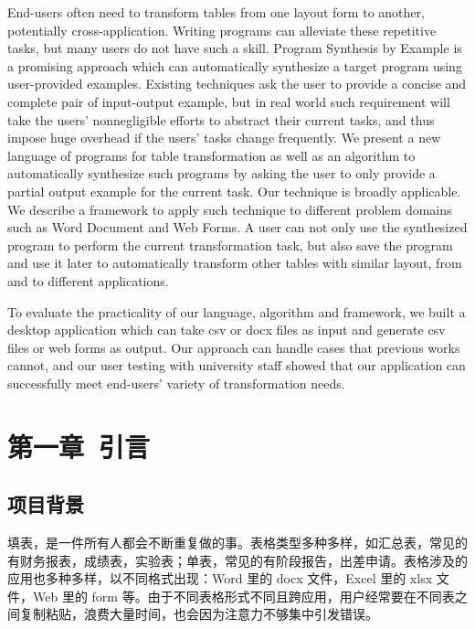 \documentclass[design, pageheader]{njubachelor}
\renewcommand{\makectitle}{}
\begin{document}
\begin{eabstract}
End-users often need to transform tables from one layout form to another, potentially cross-application.
Writing programs can alleviate these repetitive tasks, but many users do not have such a skill.
Program Synthesis by Example is a promising approach which can automatically synthesize a target program using user-provided examples.
Existing techniques ask the user to provide a concise and complete pair of input-output example, but in real world such requirement will take the users' nonnegligible efforts to abstract their current tasks, and thus impose huge overhead if the users' tasks change frequently.
We present a new language of programs for table transformation as well as an algorithm to automatically synthesize such programs by asking the user to only provide a partial output example for the current task.
Our technique is broadly applicable.
We describe a framework to apply such technique to different problem domains such as Word Document and Web Forms.
A user can not only use the synthesized program to perform the current transformation task, but also save the program and use it later to automatically transform other tables with similar layout, from and to different applications. 

To evaluate the practicality of our language, algorithm and framework, we built a desktop application which can take csv or docx files as input and generate csv files or web forms as output.
Our approach can handle cases that previous works cannot, and our user testing with university staff showed that our application can successfully meet end-users' variety of transformation needs.    


\end{eabstract}\nopagebreak

\thispagestyle{plain} %
\vspace*{0em}

\maketoc
\newpage

\listoffigures
\listoftables
\newpage


\thispagestyle{plain} %
\makectitle

\section{第一章~引言}

\subsection{项目背景}
填表，是一件所有人都会不断重复做的事。表格类型多种多样，如汇总表，常见的有财务报表，成绩表，实验表；单表，常见的有阶段报告，出差申请。表格涉及的应用也多种多样，以不同格式出现：Word 里的 docx 文件，Excel 里的 xlsx 文件，Web 里的 form 等。由于不同表格形式不同且跨应用，用户经常要在不同表之间复制粘贴，浪费大量时间，也会因为注意力不够集中引发错误\cite{stolee09}。
\end{document}
